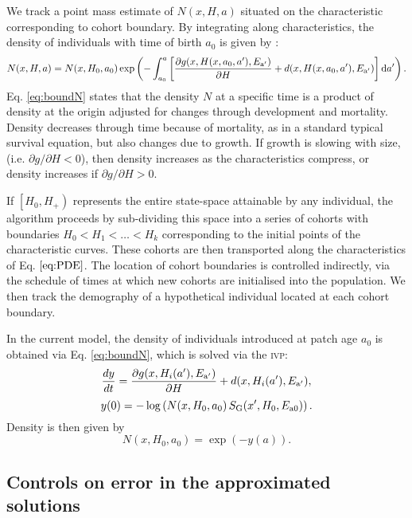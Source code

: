 \documentclass[10pt,twoside]{article}
\begin{document}
We
track a point mass estimate of \(N(x, H, a)\) situated on the characteristic
corresponding to cohort boundary. By integrating along characteristics,
the density of individuals with time of birth \(a_{0}\) is given by
\citep{Deroos-1997}:
\begin{equation}\label{eq:boundN}
  N(x, H, a) = N(x, H_0 , a_0)
   \exp \left( - \int _{a_0}^{a} \left[\frac{\partial g(x, H(x, a_0, a^\prime), E_{\rm a^\prime})}{\partial H} + d(x, H(x, a_0, a^\prime), E_{\rm a^\prime})\right] {\rm d} a^\prime \right).
\end{equation}
Eq. \ref{eq:boundN} states that the density \(N\) at a specific time is
a product of density at the origin adjusted for changes through
development and mortality. Density decreases through time because of
mortality, as in a standard typical survival equation, but also changes
due to growth. If growth is slowing with size, (i.e.
\(\partial g / \partial H < 0\)), then density increases as the
characteristics compress, or density increases if
\(\partial g / \partial H > 0\).

If \(\left[H_0, H_{ + } \right)\) represents the entire state-space
attainable by any individual, the algorithm proceeds by sub-dividing
this space into a series of cohorts with boundaries
\(H_0 < H_1 < \ldots < H_k\) corresponding to the initial points of the characteristic curves. These cohorts are then transported along
the characteristics of Eq. \(\ref{eq:PDE}\). The location of cohort
boundaries is controlled indirectly, via the schedule of times at which
new cohorts are initialised into the population. We then track the
demography of a hypothetical individual located at each cohort boundary.

In the current model, the density of individuals introduced at patch age
\(a_0\) is obtained via Eq.
\ref{eq:boundN}, which is solved via the \textsc{ivp}:
\[\frac{dy}{dt} = \frac{\partial g(x, H_i(a^\prime), E_{\rm a^\prime})}{\partial H} + d(x, H_i(a^\prime), E_{\rm a^\prime}),\]
\[ y(0) = - \log\left(N(x, H_0 , a_0) \, S_{\rm G} (x^\prime, H_0, E_{{\rm a}0}) \right).\]
Density is then given by \[N(x, H_0 , a_0) = \exp( - y(a)).\]

\subsection{Controls on error in the approximated solutions}
\end{document}
